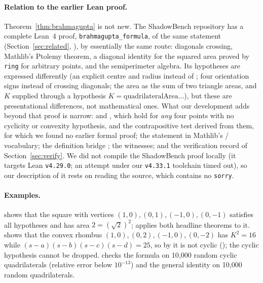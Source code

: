 \documentclass[11pt]{article}
\theoremstyle{definition}
\theoremstyle{remark}
\newcommand{\lean}[1]{\texttt{#1}}
\begin{document}
\paragraph{Relation to the earlier Lean proof.} Theorem~\ref{thm:brahmagupta} is not new. The
ShadowBench repository has a complete Lean~4 proof, \lean{brahmagupta\_formula}, of the same
statement (Section~\ref{sec:related}, \cite{ShadowBenchProof}), by essentially the same route:
diagonals crossing, Mathlib's Ptolemy theorem, a diagonal identity for the squared area proved
by \lean{ring} for arbitrary points, and the semiperimeter algebra. Its hypotheses are expressed
differently (an explicit centre and radius instead of ; four orientation
signs instead of crossing diagonals; the area as the sum of two triangle areas, and $K$ supplied
through a hypothesis $K=\mathrm{quadrilateralArea}\ldots$), but these are presentational
differences, not mathematical ones. What our development adds beyond that proof is narrow:
 and , which hold for
\emph{any} four points with no cyclicity or convexity hypothesis, and the contrapositive test
 derived from them, for which we found no earlier
formal proof; the statement in Mathlib's / vocabulary; the
definition bridge ; the witnesses; and the
verification record of Section~\ref{sec:verify}. We did not compile the ShadowBench proof
locally (it targets Lean \texttt{v4.29.0}; an attempt under our \texttt{v4.33.1} toolchain timed
out), so our description of it rests on reading the source, which contains no \lean{sorry}.

\paragraph{Examples.}  shows that the square with vertices
$(1,0),(0,1),(-1,0),(0,-1)$ satisfies all hypotheses and has area $2=(\sqrt2)^2$;
 applies both headline theorems to it.
 shows that the convex rhombus $(1,0),(0,2),(-1,0),(0,-2)$ has
$K^2=16$ while $(s-a)(s-b)(s-c)(s-d)=25$, so by 
it is not cyclic (); the cyclic hypothesis cannot be
dropped.  checks the formula on 10{,}000 random cyclic
quadrilaterals (relative error below $10^{-13}$) and the general identity on 10{,}000 random
quadrilaterals.
\end{document}

